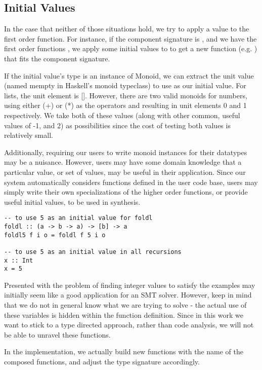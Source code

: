\subsection{Initial Values}
In the case that neither of those situations hold, we try to apply a value to the first order function.
For instance, if the component signature is , and we have the first order functions , we apply some initial values to \codeinline{(+)} to get a new function (e.g. ) that fits the component signature.

If the initial value's type is an instance of Monoid, we can extract the unit value (named mempty in Haskell's monoid typeclass\cite{monoid}) to use as our initial value. For lists, the unit element is []. However, there are two valid monoids for numbers, using either (+) or (*) as the operators and resulting in unit elements 0 and 1 respectively. We take both of these values (along with other common, useful values of -1, and 2) as possibilities since the cost of testing both values is relatively small.

Additionally, requiring our users to write monoid instances for their datatypes may be a nuisance. However, users may have some domain knowledge that a particular value, or set of values, may be useful in their application. Since our system automatically considers functions defined in the user code base, users may simply write their own specializations of the higher order functions, or provide useful initial values, to be used in synthesis. 

\begin{lstlisting}
-- to use 5 as an initial value for foldl
foldl :: (a -> b -> a) -> [b] -> a
foldl5 f i o = foldl f 5 i o

-- to use 5 as an initial value in all recursions
x :: Int
x = 5
\end{lstlisting}

Presented with the problem of finding integer values to satisfy the examples may initially seem like a good application for an SMT solver. However, keep in mind that we do not in general know what we are trying to solve - the actual use of these variables is hidden within the function definition. Since in this work we want to stick to a type directed approach, rather than code analysis, we will not be able to unravel these functions.

In the implementation, we actually build new functions with the name of the composed functions, and adjust the type signature accordingly.


